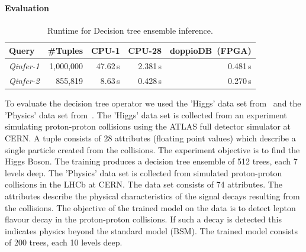 \documentclass[11pt,dvipdfm]{article}
\newcommand{\centercell}[1]{\multicolumn{1}{c|}{#1}}
\newcommand{\head}[1]{\centercell{\textbf{#1}}}
\newcommand{\headlast}[1]{\multicolumn{1}{c}{\textbf{#1}}}
\begin{document}
\paragraph{\textbf{Evaluation}}

\begin{table}[tp]
\vspace{-.5em}
	\centering
	\caption{Runtime for Decision tree ensemble inference.}
\vspace{-.5em}
	\def\arraystretch{1.2}
	\begin{tabular}{l|r|r|r|r}
		\textbf{Query} & \head{\#Tuples} & \head{CPU-1} & \head{CPU-28} & \headlast{doppioDB~(FPGA)} \\ \hline 
		\emph{Qinfer-1}& 1,000,000 &  47.62\,s & 2.381\,s & 0.481\,s \\ 
		\emph{Qinfer-2}& 855,819 & 8.63\,s & 0.428\,s  & 0.270\,s \\  
	\end{tabular} 
	\label{tab:dt-result}
\end{table}

To evaluate the decision tree operator we used the 'Higgs' data set from~\cite{salimans2014} and the 'Physics' data set from~\cite{pyhsics2015}.  
The 'Higgs' data set is collected from an experiment simulating proton-proton collisions using the ATLAS full detector simulator at CERN.  A tuple consists of 28 attributes (floating point values) which describe a single particle created from the collisions. 
The experiment objective is to find the Higgs Boson. The training produces a decision tree ensemble of 512 trees, each 7 levels deep.
The 'Physics' data set is  collected from simulated proton-proton collisions in the LHCb at CERN. The data set consists of 74 attributes. The attributes describe the physical characteristics of the signal decays resulting from the collisions. The objective of the trained model on the data is to detect lepton flavour decay in the proton-proton collisions. If such a decay is detected this indicates physics beyond the standard model (BSM). 
The trained model consists of 200 trees, each 10 levels deep.
\end{document}
